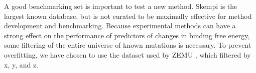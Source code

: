 \documentclass{article}
\begin{document}
A good benchmarking set is important to test a new method. Skempi \cite{moal_skempi:_2012} is the largest known database, but is not curated to be maximally effective for method development and benchmarking. Because experimental methods can have a strong effect on the performance of predictors of changes in binding free energy\cite{geng_exploring_2016}, some filtering of the entire universe of known mutations is necessary. To prevent overfitting, we have chosen to use the dataset used by ZEMU \cite{dourado_multiscale_2014}, which filtered by x, y, and z.



\end{document}
